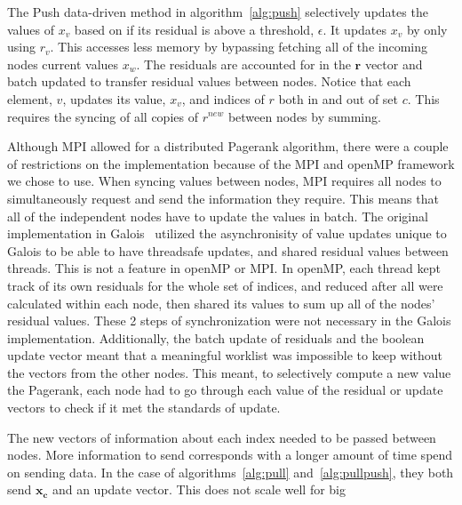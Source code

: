 \documentclass[letterpaper,11pt,onecolumn]{article}
\begin{document}
The Push data-driven method in algorithm~\ref{alg:push} selectively updates the values of $x_v$ based on if its residual is above a threshold, $\epsilon$. It updates $x_v$ by only using $r_v$. This accesses less memory by bypassing fetching all of the incoming nodes current values $x_w$. The residuals are accounted for in the $\mathbf{r}$ vector and batch updated to transfer residual values between nodes. Notice that each element, $v$, updates its value, $x_v$, and indices of $r$ both in and out of set $c$. This requires the syncing of all copies of $r^{new}$ between nodes by summing. 

Although MPI allowed for a distributed Pagerank algorithm, there were a couple of restrictions on the implementation because of the MPI and openMP framework we chose to use. When syncing values between nodes, MPI requires all nodes to simultaneously request and send the information they require. This means that all of the independent nodes have to update the values in batch. The original implementation in Galois~\cite{Joyce} utilized the asynchronisity of value updates unique to Galois to be able to have threadsafe updates, and shared residual values between threads. This is not a feature in openMP or MPI. In openMP, each thread kept track of its own residuals for the whole set of indices, and reduced after all were calculated within each node, then shared its values to sum up all of the nodes' residual values. These 2 steps of synchronization were not necessary in the Galois implementation. Additionally, the batch update of residuals and the boolean update vector meant that a meaningful worklist was impossible to keep without the vectors from the other nodes. This meant, to selectively compute a new value the Pagerank, each node had to go through each value of the residual or update vectors to check if it met the standards of update. 

The new vectors of information about each index needed to be passed between nodes. More information to send corresponds with a longer amount of time spend on sending data. In the case of algorithms~\ref{alg:pull} and~\ref{alg:pullpush}, they both send $\mathbf{x_c}$ and an update vector. This does not scale well for big 
\end{document}
